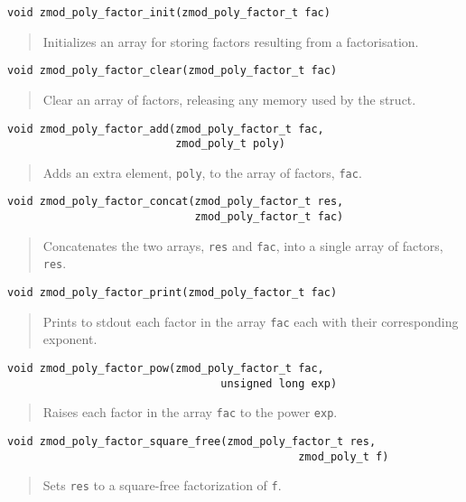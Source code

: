 \documentclass[a4paper,10pt]{article}
\newcommand{\code}{\lstinline}
\begin{document}
\begin{lstlisting}
void zmod_poly_factor_init(zmod_poly_factor_t fac)
\end{lstlisting}
\begin{quote}
Initializes an array for storing factors resulting from a factorisation.  \end{quote}

\begin{lstlisting}
void zmod_poly_factor_clear(zmod_poly_factor_t fac)
\end{lstlisting}
\begin{quote}
Clear an array of factors, releasing any memory used by the struct.
\end{quote}

\begin{lstlisting}
void zmod_poly_factor_add(zmod_poly_factor_t fac,
                          zmod_poly_t poly)
\end{lstlisting}
\begin{quote}
Adds an extra element, \code{poly}, to the array of factors, \code{fac}.  
\end{quote}

\begin{lstlisting}
void zmod_poly_factor_concat(zmod_poly_factor_t res,
                             zmod_poly_factor_t fac)
\end{lstlisting}
\begin{quote}
Concatenates the two arrays, \code{res} and \code{fac}, into a single array of factors, \code{res}.  
\end{quote}

\begin{lstlisting}
void zmod_poly_factor_print(zmod_poly_factor_t fac)
\end{lstlisting}
\begin{quote}
Prints to stdout each factor in the array \code{fac} each with their corresponding exponent.
\end{quote}

\begin{lstlisting}
void zmod_poly_factor_pow(zmod_poly_factor_t fac, 
                                 unsigned long exp)
\end{lstlisting}
\begin{quote}
Raises each factor in the array \code{fac} to the power \code{exp}.
\end{quote}

\begin{lstlisting}
void zmod_poly_factor_square_free(zmod_poly_factor_t res,
                                             zmod_poly_t f)
\end{lstlisting}
\begin{quote}
Sets \code{res} to a square-free factorization of \code{f}.
\end{quote}
\end{document}
